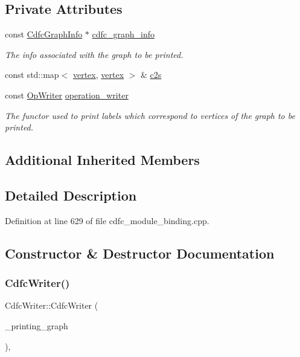 \subsection*{Private Attributes}
\begin{DoxyCompactItemize}
\item 
const \hyperlink{structCdfcGraphInfo}{Cdfc\+Graph\+Info} $\ast$ \hyperlink{classCdfcWriter_a74b6b6e42d3dfe1ef189d0448bcbd19a}{cdfc\+\_\+graph\+\_\+info}
\begin{DoxyCompactList}\small\item\em The info associated with the graph to be printed. \end{DoxyCompactList}\item 
const std\+::map$<$ \hyperlink{graph_8hpp_abefdcf0544e601805af44eca032cca14}{vertex}, \hyperlink{graph_8hpp_abefdcf0544e601805af44eca032cca14}{vertex} $>$ \& \hyperlink{classCdfcWriter_ae34942dd3bb12bc5b804fb4584eb8eed}{c2s}
\item 
const \hyperlink{classOpWriter}{Op\+Writer} \hyperlink{classCdfcWriter_a8c0428c02685009db8d288bed18328ec}{operation\+\_\+writer}
\begin{DoxyCompactList}\small\item\em The functor used to print labels which correspond to vertices of the graph to be printed. \end{DoxyCompactList}\end{DoxyCompactItemize}
\subsection*{Additional Inherited Members}


\subsection{Detailed Description}


Definition at line 629 of file cdfc\+\_\+module\+\_\+binding.\+cpp.



\subsection{Constructor \& Destructor Documentation}
\mbox{\label{classCdfcWriter_a5335ee5a03a31f3f491583fafc9cf5a3}} 
\subsubsection{\texorpdfstring{Cdfc\+Writer()}{CdfcWriter()}}
{\footnotesize\ttfamily Cdfc\+Writer\+::\+Cdfc\+Writer (\begin{DoxyParamCaption}\item[{const \hyperlink{classCdfcGraph}{Cdfc\+Graph} $\ast$}]{\+\_\+printing\+\_\+graph }\end{DoxyParamCaption})\hspace{0.3cm}{\ttfamily [inline]}, {\ttfamily [explicit]}}



